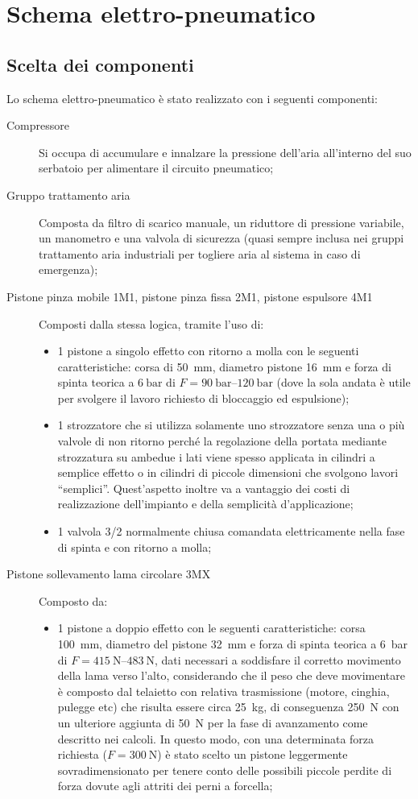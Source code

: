 \documentclass{report}
\begin{document}
\section{Schema elettro-pneumatico}
\subsection{Scelta dei componenti}
Lo schema elettro-pneumatico è stato realizzato con i seguenti componenti:
\begin{description}
\item[Compressore] Si occupa di accumulare e innalzare la pressione dell’aria all’interno del suo serbatoio per alimentare il circuito pneumatico;
\item[Gruppo trattamento aria] Composta da filtro di scarico manuale, un riduttore di pressione variabile, un manometro e una valvola di sicurezza (quasi sempre inclusa nei gruppi trattamento aria industriali per togliere aria al sistema in caso di emergenza);
\item[Pistone pinza mobile 1M1, pistone pinza fissa 2M1, pistone espulsore 4M1] Composti dalla stessa logica, tramite l'uso di:
  \begin{itemize}
  \item 1 pistone a singolo effetto con ritorno a molla con le seguenti caratteristiche: corsa di \SI{50}{\mm}, diametro pistone \SI{16}{\mm} e forza di spinta teorica a $\SI{6}{\bar}$ di $F=\SIrange{90}{120}{\bar}$ (dove la sola andata è utile per svolgere il lavoro richiesto di bloccaggio ed espulsione);
  \item 1 strozzatore che si utilizza solamente uno strozzatore senza una o più valvole di non ritorno perché la regolazione della portata mediante strozzatura su ambedue i lati viene spesso applicata in cilindri a semplice effetto o in cilindri di piccole dimensioni che svolgono lavori “semplici”. Quest’aspetto inoltre va a vantaggio dei costi di realizzazione dell’impianto e della semplicità d’applicazione;
  \item 1 valvola 3/2 normalmente chiusa comandata elettricamente nella fase di spinta e con ritorno a molla;
  \end{itemize}
\item[Pistone sollevamento lama circolare 3MX] Composto da:
  \begin{itemize}
  \item 1 pistone a doppio effetto con le seguenti caratteristiche: corsa \SI{100}{\mm}, diametro del pistone \SI{32}{\mm} e forza di spinta teorica a \SI{6}{\bar} di $F=\SIrange{415}{483}{\N}$, dati necessari a soddisfare il corretto movimento della lama verso l'alto, considerando che il peso che deve movimentare è composto dal telaietto con relativa trasmissione (motore, cinghia, pulegge etc) che risulta essere circa \SI{25}{\kg}, di conseguenza \SI{250}{\N} con un ulteriore aggiunta di \SI{50}{\N} per la fase di avanzamento come descritto nei calcoli. In questo modo, con una determinata forza richiesta ($F=\SI{300}{\N}$) è stato scelto un pistone leggermente sovradimensionato per tenere conto delle possibili piccole perdite di forza dovute agli attriti dei perni a forcella;

\end{itemize}
\end{description}
\end{document}
